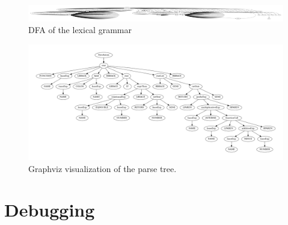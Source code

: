 \begin{figure}[t]
\includegraphics[width=\linewidth]{images/dfa.png}
\caption{DFA of the lexical grammar}
\label{fig:dfa}
\end{figure}

\begin{figure}[t]
\includegraphics[width=\linewidth]{images/ptree.png}
\caption{Graphviz visualization of the parse tree.}
\label{fig:parse_tree}
\end{figure}

\section{Debugging} \label{debugging}
